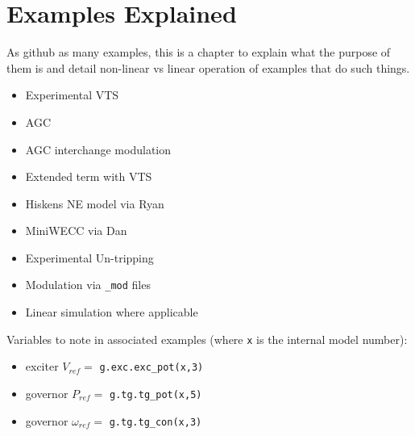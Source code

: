\chapter{Examples Explained}
As github as many examples, this is a chapter to explain what the purpose of them is and detail non-linear vs linear operation of examples that do such things.

\begin{itemize}
\item Experimental VTS
\item AGC
\item AGC interchange modulation
\item Extended term with VTS
\item Hiskens NE model via Ryan
\item MiniWECC via Dan
\item Experimental Un-tripping
\item Modulation via \verb|_mod| files
\item Linear simulation where applicable
\end{itemize}

Variables to note in associated examples (where \verb|x| is the internal model number):
\begin{itemize}
\item exciter $V_{ref} = $ \verb|g.exc.exc_pot(x,3)|
\item governor $P_{ref} = $ \verb|g.tg.tg_pot(x,5)|
\item governor $\omega_{ref} = $ \verb|g.tg.tg_con(x,3)|
\end{itemize}

